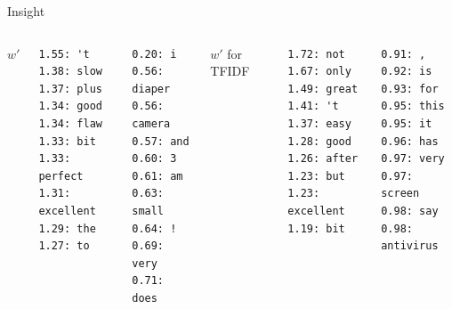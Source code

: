 \documentclass[xcolor={table}]{beamer}
\begin{document}
\begin{frame}[fragile]{Insight}
    \begin{columns}
        	$w'$ 
\begin{verbatim}
1.55: 't
1.38: slow
1.37: plus
1.34: good
1.34: flaw
1.33: bit
1.33: perfect
1.31: excellent
1.29: the
1.27: to
\end{verbatim}
\begin{verbatim}
0.20: i
0.56: diaper
0.56: camera
0.57: and
0.60: 3
0.61: am
0.63: small
0.64: !
0.69: very
0.71: does
\end{verbatim}
        $w'$ for TFIDF
\begin{verbatim}
1.72: not
1.67: only
1.49: great
1.41: 't
1.37: easy
1.28: good
1.26: after
1.23: but
1.23: excellent
1.19: bit
\end{verbatim}
\begin{verbatim}
0.91: ,
0.92: is
0.93: for
0.95: this
0.95: it
0.96: has
0.97: very
0.97: screen
0.98: say
0.98: antivirus
\end{verbatim}
    \end{columns}
\end{frame}
\end{document}
